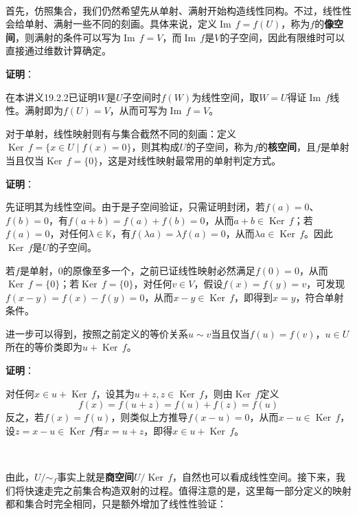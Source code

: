 \documentclass[a4paper,UTF8,fontset=windows,AutoFakeBold]{ctexart}
\DeclareMathOperator{\im}{Im\,}
\DeclareMathOperator{\Ker}{Ker\,}
\newcommand{\proo}[1]{{\vspace{5pt}\kaishu\noindent\textbf{证明}：\vspace{-3pt}
\begin{compactitem}
    \item[] #1
\end{compactitem}
}}
\begin{document}
\

首先，仿照集合，我们仍然希望先从单射、满射开始构造线性同构。不过，线性性会给单射、满射一些不同的刻画。具体来说，定义$\im f=f(U)$，称为$f$的\textbf{像空间}，则满射的条件可以写为$\im f=V$，而$\im f$是$V$的子空间，因此有限维时可以直接通过维数计算确定。

\proo{
    在本讲义19.2.2已证明$W$是$U$子空间时$f(W)$为线性空间，取$W=U$得证$\im f$线性。满射即为$f(U)=V$，从而可写为$\im f=V$。
}

对于单射，线性映射则有与集合截然不同的刻画：定义$\Ker f=\{x\in U\mid f(x)=0\}$，则其构成$U$的子空间，称为$f$的\textbf{核空间}，且$f$是单射当且仅当$\Ker f=\{0\}$，这是对线性映射最常用的单射判定方式。

\proo{
    先证明其为线性空间。由于是子空间验证，只需证明封闭，若$f(a)=0$、$f(b)=0$，有$f(a+b)=f(a)+f(b)=0$，从而$a+b\in\Ker f$；若$f(a)=0$，对任何$\lambda\in\mathbb{K}$，有$f(\lambda a)=\lambda f(a)=0$，从而$\lambda a\in\Ker f$。因此$\Ker f$是$U$的子空间。

    若$f$是单射，0的原像至多一个，之前已证线性映射必然满足$f(0)=0$，从而$\Ker f=\{0\}$；若$\Ker f=\{0\}$，对任何$v\in V$，假设$f(x)=f(y)=v$，可发现$f(x-y)=f(x)-f(y)=0$，从而$x-y\in\Ker f$，即得到$x=y$，符合单射条件。
}

进一步可以得到，按照之前定义的等价关系$u\sim v$当且仅当$f(u)=f(v)$，$u\in U$所在的等价类即为$u+\Ker f$。

\proo{
    对任何$x\in u+\Ker f$，设其为$u+z,z\in\Ker f$，则由$\Ker f$定义
    $$f(x)=f(u+z)=f(u)+f(z)=f(u)$$
    反之，若$f(x)=f(u)$，则类似上方推导$f(x-u)=0$，从而$x-u\in\Ker f$，设$z=x-u\in\Ker f$有$x=u+z$，即得$x\in u+\Ker f$。
}

\

由此，$U/\sim_f$事实上就是\textbf{商空间}$U/\Ker f$，自然也可以看成线性空间。接下来，我们将快速走完之前集合构造双射的过程。值得注意的是，这里每一部分定义的映射都和集合时完全相同，只是额外增加了线性性验证：
\end{document}
